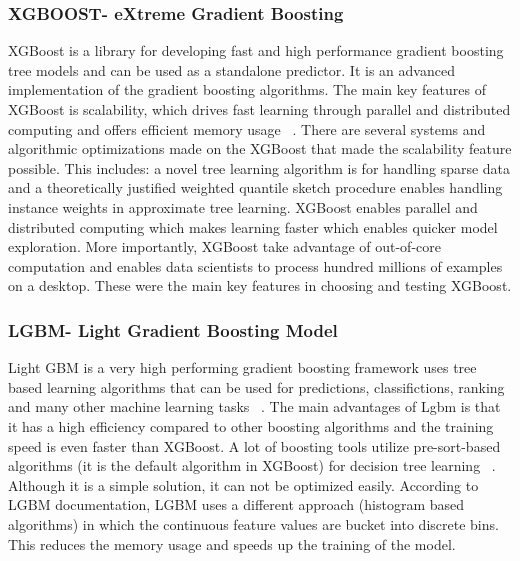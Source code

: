\documentclass[journal,twoside,web]{ieeecolor}
\begin{document}
\subsubsection{XGBOOST- eXtreme Gradient Boosting}
XGBoost is a library for developing fast and high performance gradient boosting tree models and can be used as a standalone predictor. It is an advanced implementation of the gradient boosting algorithms. The main key features of XGBoost is scalability, which drives fast learning through parallel and distributed computing and offers efficient memory usage ~\cite{kdnuggets_analytics_big_data_data_mining_and_data_science}. There are several systems and algorithmic optimizations made on the XGBoost that made the scalability feature possible. This includes: a novel tree learning algorithm is for handling sparse data and a theoretically justified weighted quantile sketch procedure enables handling instance weights in approximate tree learning. XGBoost enables parallel and distributed computing which makes learning faster which enables quicker model exploration. More importantly, XGBoost take advantage of out-of-core computation and enables data scientists to process hundred millions of examples on a desktop. These were the main key features in choosing and testing XGBoost. 

\subsubsection{LGBM- Light Gradient Boosting Model} 
Light GBM is a very high performing gradient boosting framework uses tree based learning algorithms that can be used for predictions, classifictions, ranking and many other machine learning tasks ~\cite{lightgbm_documentation}. The main advantages of Lgbm is that it has a high efficiency compared to other boosting algorithms and the training speed is even faster than XGBoost. A lot of boosting tools utilize pre-sort-based algorithms (it is the default algorithm in XGBoost) for decision tree learning ~\cite{mehta1996sliq}. Although it is a simple solution, it can not be optimized easily. According to LGBM documentation, LGBM uses a different approach (histogram based algorithms) in which the continuous feature values are bucket into discrete bins. This reduces the memory usage and speeds up the training of the model. 
\end{document}
